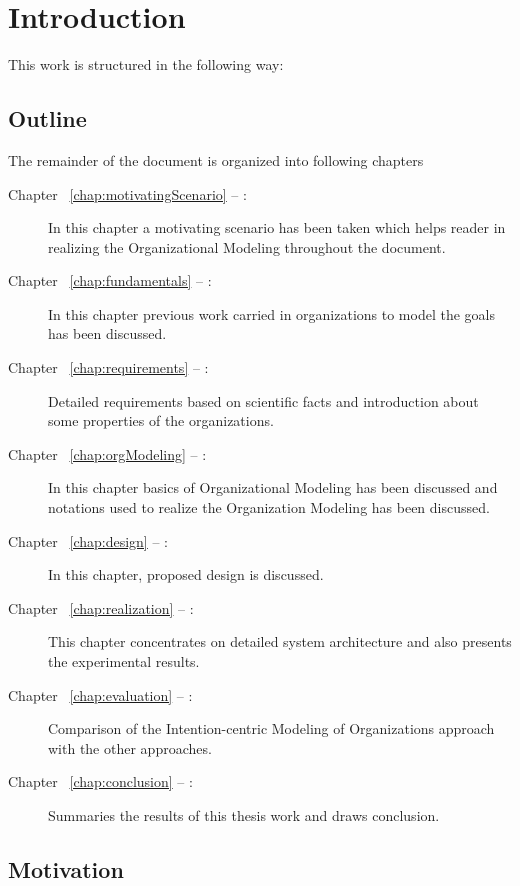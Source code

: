 \chapter{Introduction}
\label{chap:introduction}
This work is structured in the following way:


\section*{Outline}
The remainder of the document is organized into following chapters
\begin{description}
\item[Chapter ~\ref{chap:motivatingScenario} -- :] In this chapter a motivating scenario has been taken which helps reader in realizing the Organizational Modeling throughout the document. 
\item[Chapter ~\ref{chap:fundamentals} -- :] In this chapter previous work carried in organizations to model the goals has been discussed.
\item[Chapter ~\ref{chap:requirements} -- :] Detailed requirements based on scientific facts and introduction about some properties of the organizations.
\item[Chapter ~\ref{chap:orgModeling} -- :] In this chapter basics of Organizational Modeling has been discussed and notations used to realize the Organization Modeling has been discussed.
\item[Chapter ~\ref{chap:design} -- :] In this chapter, proposed design is discussed. 
 
\item[Chapter ~\ref{chap:realization} -- :] This chapter concentrates on detailed system architecture and also presents the experimental results.
\item[Chapter ~\ref{chap:evaluation} -- :] Comparison of the Intention-centric Modeling of Organizations approach with the other approaches.
\item[Chapter ~\ref{chap:conclusion} -- :] Summaries the results of this thesis work and draws conclusion. 
\end{description}


\section{Motivation}


